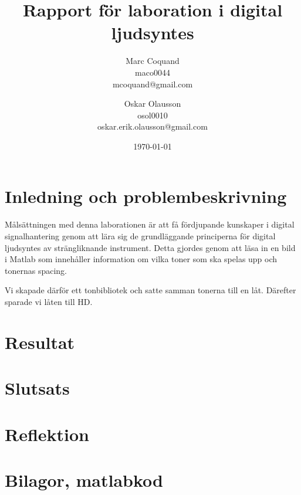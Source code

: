 \documentclass[12pt]{article}
\title{Rapport för laboration i digital ljudsyntes}
\author{
    Marc Coquand \\
    maco0044 \\
    mcoquand@gmail.com\\
    \and
    Oskar Olausson \\
    osol0010 \\
    oskar.erik.olausson@gmail.com\\
}
\date{\today}
\begin{document}
\lstset{language=Matlab}
\maketitle
\tableofcontents

\newpage

\section{Inledning och problembeskrivning}

Målsättningen med denna laborationen är att få fördjupande kunskaper i digital
signalhantering genom att lära sig de grundläggande principerna för digital
ljudsyntes av strängliknande instrument. Detta gjordes genom att läsa in en bild
i Matlab som innehåller information om vilka toner som ska spelas upp och
tonernas spacing. 

Vi skapade därför ett tonbibliotek och satte samman tonerna till en låt.
Därefter sparade vi låten till HD.



\section{Resultat}

\section{Slutsats}

\section{Reflektion}

\section{Bilagor, matlabkod}
\label{sec:bilagor}

%
\end{document}
